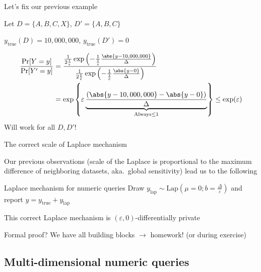\documentclass[12pt,aspectratio=169,handout]{beamer}
\begin{document}
\begin{frame}{Let's fix our previous example}

Let $D = \{A, B, C, X\}$, $D' = \{A, B, C\}$

$y_{\mathrm{true}}(D) = 10,000,000$, $y_{\mathrm{true}}(D') = 0$


$$
\begin{aligned}
\frac{\Pr[Y = y]}{\Pr[Y' = y]} &=
\frac{
\frac{1}{2\frac{1}{\varepsilon}} \exp \left(- \frac{1}{\frac{1}{\varepsilon}}
\frac{
\abs{y - 10,000,000}
}{\Delta}
\right)
}{
\frac{1}{2\frac{1}{\varepsilon}} \exp \left(- \frac{1}{\frac{1}{\varepsilon}}
\frac{
\abs{y - 0}
}{\Delta}
\right) 
} \\
&=
\exp \left\{ \varepsilon
\underbrace{
\frac{
\left( \abs{y - 10,000,000} - \abs{y - 0} \right)
}{\Delta}
}_{\text{Always} \leq 1}
\right\}  \leq \exp(\varepsilon) \\
\end{aligned}
$$
Will work for all $D, D'$!
\end{frame}


\begin{frame}{The correct scale of Laplace mechanism}

Our previous observations (scale of the Laplace is proportional to the maximum difference of neighboring datasets, aka.\ global sensitivity) lead us to the following

\begin{block}{Laplace mechanism for numeric queries}
Draw $y_{\mathrm{lap}} \sim \textrm{Lap}(\mu = 0; b=\frac{\Delta}{\varepsilon})$ and report $y = y_{\mathrm{true}} + y_{\mathrm{lap}}$
\end{block}

This correct Laplace mechanism is $(\varepsilon, 0)$-differentially private

Formal proof? We have all building blocks $\rightarrow$ homework! (or during exercise)

\end{frame}


\subsection{Multi-dimensional numeric queries}
\end{document}
